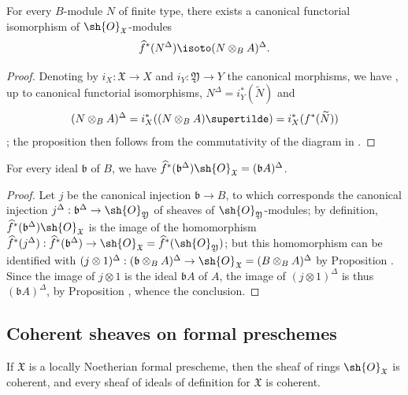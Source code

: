 \begin{proposition}[10.10.8]
\label{I.10.10.8}
For every $B$-module $N$ of finite type, there exists a canonical functorial isomorphism of $\sh{O}_\mathfrak{X}$-modules
\[
  \widehat{f}^*(N^\Delta)\isoto(N\otimes_B A)^\Delta.
\]
\end{proposition}

\begin{proof}
Denoting by $i_X:\mathfrak{X}\to X$ and $i_Y:\mathfrak{Y}\to Y$ the canonical morphisms, we have , up to canonical functorial isomorphisms, $N^\Delta=i_Y^*(\widetilde{N})$ and
\[
  (N\otimes_B A)^\Delta=i_X^*((N\otimes_B A)\supertilde)=i_X^*(f^*(\widetilde{N}))
\]
; the proposition then follows from the commutativity of the diagram in .
\end{proof}

\begin{corollary}
\label{I.10.10.9}
For every ideal $\mathfrak{b}$ of $B$, we have $\widehat{f}^*(\mathfrak{b}^\Delta)\sh{O}_\mathfrak{X}=(\mathfrak{b}A)^\Delta$.
\end{corollary}

\begin{proof}
Let $j$ be the canonical injection $\mathfrak{b}\to B$, to which corresponds the canonical injection $j^\Delta:\mathfrak{b}^\Delta\to\sh{O}_\mathfrak{Y}$ of sheaves of $\sh{O}_\mathfrak{Y}$-modules; by definition, $\widehat{f}^*(\mathfrak{b}^\Delta)\sh{O}_\mathfrak{X}$ is the image of the homomorphism $\widehat{f}^*(j^\Delta):\widehat{f}^*(\mathfrak{b}^\Delta)\to\sh{O}_\mathfrak{X}=\widehat{f}^*(\sh{O}_\mathfrak{Y})$; but this homomorphism can be identified with $(j\otimes 1)^\Delta:(\mathfrak{b}\otimes_B A)^\Delta\to\sh{O}_\mathfrak{X}=(B\otimes_B A)^\Delta$ by Proposition .
Since the image of $j\otimes 1$ is the ideal $\mathfrak{b}A$ of $A$, the image of $(j\otimes 1)^\Delta$ is thus $(\mathfrak{b}A)^\Delta$, by Proposition , whence the conclusion.
\end{proof}

\subsection{Coherent sheaves on formal preschemes}
\label{subsection:I.10.11}

\begin{proposition}[10.11.1]
\label{I.10.11.1}
If $\mathfrak{X}$ is a locally Noetherian formal prescheme, then the sheaf of rings $\sh{O}_\mathfrak{X}$ is coherent, and every sheaf of ideals of definition for $\mathfrak{X}$ is coherent.
\end{proposition}

